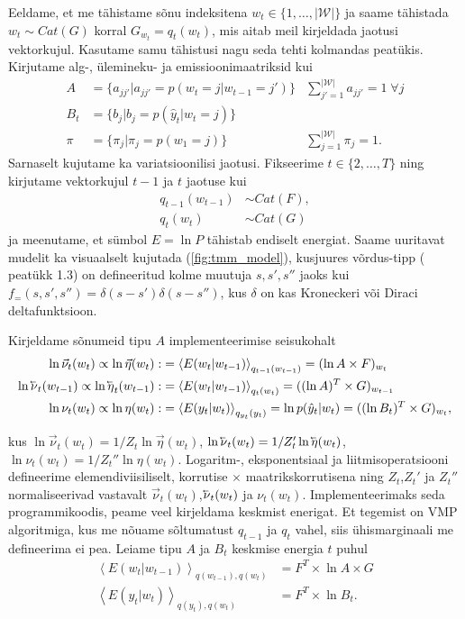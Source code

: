 Eeldame, et me tähistame sõnu indeksitena $w_t \in \{1,\ldots,|\mathcal{W}|\}$ ja saame tähistada $w_t \sim Cat(G)$ korral $G_{w_t} = q_t(w_t)$, mis aitab meil kirjeldada jaotusi vektorkujul. Kasutame samu tähistusi nagu seda tehti \cite{Beal2003VariationalAF}{ kolmandas peatükis}. Kirjutame alg-, ülemineku- ja emissioonimaatriksid kui
\begin{align*}
   A &= \{a_{jj'} | a_{jj'} = p(w_t = j | w_{t-1} = j')\} &\sum_{j'=1}^{|\mathcal{W}|} a_{jj'} = 1 \; \forall j\\
   B_t &= \{ b_j | b_j = p(\hat{y}_t | w_t = j)\}\\
    \pi &= \{ \pi_j | \pi_j = p(w_1 = j) \} &\sum_{j=1}^{|\mathcal{W}|} \pi_{j} = 1.
\end{align*}
Sarnaselt kujutame ka variatsioonilisi jaotusi. Fikseerime $t \in \{2,\ldots,T\}$ ning kirjutame vektorkujul $t-1$ ja $t$ jaotuse kui
\begin{align*}
    q_{t-1}(w_{t-1}) &\sim Cat(F),\\
    q_{t}(w_{t}) &\sim Cat(G)
\end{align*}
ja meenutame, et sümbol $E = \ln P$ tähistab endiselt energiat. Saame uuritavat mudelit ka visuaalselt kujutada (\ref{fig:tmm_model}), kusjuures võrdus-tipp  (\cite{COX2019185}{ peatükk 1.3}) on defineeritud kolme muutuja $s,s',s''$ jaoks kui $f_=(s,s',s'') = \delta(s-s')\delta(s-s'')$, kus $\delta$ on kas Kroneckeri või Diraci deltafunktsioon.

Kirjeldame sõnumeid tipu $A$ implementeerimise seisukohalt
\begin{align*}
    \ln \vec{\nu}_{t}(w_t) \propto \ln \vec{\eta}(w_t) :&= \left< E(w_t | w_{t-1}) \right>_{q_{t-1}(w_{t-1})} = (\ln A \times F)_{w_t} \\
    \ln \cev{\nu}_t(w_{t-1}) \propto \ln \cev{\eta}_t(w_{t-1}) :&= \left< E(w_{t} | w_{t-1}) \right>_{q_{t}(w_{t})} = ((\ln A)^T \times G)_{w_{t-1}}\\
    \ln \nu_t(w_t) \propto \ln \eta(w_t) :&= \left< E(y_t | w_t) \right>_{q_{y_{t}}(y_t)} = \ln p(\hat{y}_t | w_t) = ((\ln B_t)^T \times 
    G)_{w_t},
\end{align*}

kus $\ln \vec{\nu}_{t}(w_t) = 1/Z_t \ln \vec{\eta}(w_t) $, $\ln \cev{\nu}_{t}(w_t) = 1/Z_t' \ln \cev{\eta}(w_t) $, $\ln \nu_{t}(w_t) = 1/Z_t'' \ln \eta(w_t)$. Logaritm-, eksponentsiaal ja liitmisoperatsiooni defineerime elemendiviisiliselt, korrutise $\times$  maatrikskorrutisena ning $Z_t$,$Z_t'$ ja $Z_t''$ normaliseerivad vastavalt $\vec{\nu}_t(w_t)$,$\cev{\nu}_t(w_t)$ ja $\nu_t(w_t)$. Implementeerimaks seda programmikoodis, peame veel kirjeldama keskmist enerigat. Et tegemist on VMP algoritmiga, kus me nõuame sõltumatust $q_{t-1}$ ja $q_t$ vahel, siis ühismarginaali me defineerima ei pea. Leiame tipu $A$ ja $B_t$ keskmise energia $t$ puhul
\begin{align*}
    \left<E(w_t|w_{t-1}) \right>_{q(w_{t-1}),q(w_t) } &= F^T \times \ln A \times G\\
    \left<E(y_t|w_t) \right>_{q(y_t),q(w_t) } &= F^T \times \ln B_t.
\end{align*}

